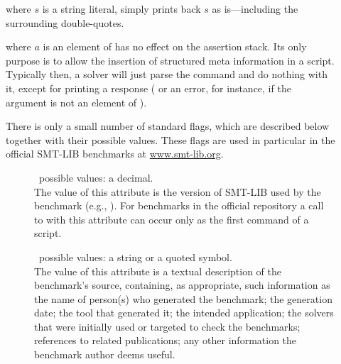 \begin{description}

%
\item[] 
where $s$ is a string literal, simply prints back $s$ as is---including 
the surrounding double-quotes.
\smallskip

%
\item[] where $a$ is an element of 
has no effect on the assertion stack.
Its only purpose is to allow the insertion of structured meta information 
in a script.
Typically then, a solver will just parse the command and do nothing with it, 
except for printing a response ( or an error, for instance,
if the argument is not an element of ).

There is only a small number of standard  flags,
which are described below together with their possible values.
These flags are used in particular in the official SMT-LIB benchmarks
at \href{http://www.smt-lib.org/benchmarks.shtml}{www.smt-lib.org}.

\begin{description}
\item[] \ 
possible values: a decimal.
\\
The value of this attribute is the version of SMT-LIB used by the benchmark (e.g., ).
For benchmarks in the official repository a call to \ter{set-info} with this attribute can occur only as the first command of a script.

\item[] \ 
possible values: a string or a quoted symbol.
\\
The value of this attribute is a textual description of the benchmark's source,
containing, as appropriate, such information as
the name of person(s) who generated the benchmark;
the generation date; %
the tool that generated it;
the intended application;
the solvers that were initially used or targeted to check the benchmarks;
references to related publications; 
any other information the benchmark author deems useful.


\end{description}
\end{description}
